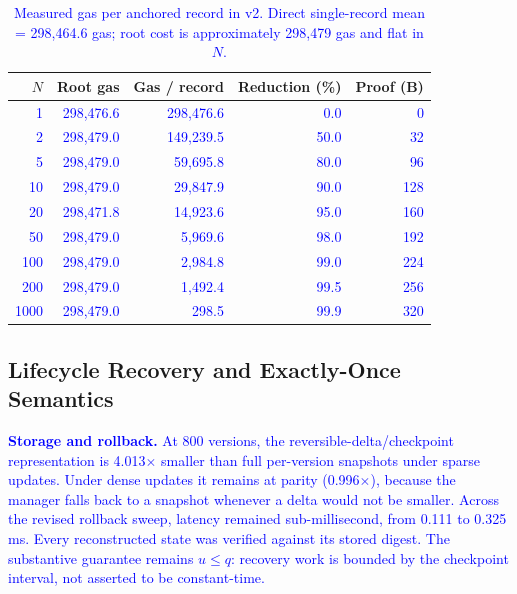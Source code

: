 \documentclass[final,5p,times,twocolumn]{elsarticle}
\begin{document}
\begin{table}[htbp]\centering
\caption{\textcolor{blue}{Measured gas per anchored record in v2. Direct single-record mean = 298{,}464.6 gas; root cost is approximately 298{,}479 gas and flat in $N$.}}
\label{tab:gas}
\scriptsize
\setlength{\tabcolsep}{2.4pt}
\begin{tabular}{rrrrr}\toprule
$N$ & Root gas & Gas / record & Reduction (\%) & Proof (B) \\\midrule
\textcolor{blue}{1}   & \textcolor{blue}{298{,}476.6} & \textcolor{blue}{298{,}476.6} & \textcolor{blue}{0.0} & \textcolor{blue}{0} \\
\textcolor{blue}{2}   & \textcolor{blue}{298{,}479.0} & \textcolor{blue}{149{,}239.5} & \textcolor{blue}{50.0} & \textcolor{blue}{32} \\
\textcolor{blue}{5}   & \textcolor{blue}{298{,}479.0} & \textcolor{blue}{59{,}695.8} & \textcolor{blue}{80.0} & \textcolor{blue}{96} \\
\textcolor{blue}{10}  & \textcolor{blue}{298{,}479.0} & \textcolor{blue}{29{,}847.9} & \textcolor{blue}{90.0} & \textcolor{blue}{128} \\
\textcolor{blue}{20}  & \textcolor{blue}{298{,}471.8} & \textcolor{blue}{14{,}923.6} & \textcolor{blue}{95.0} & \textcolor{blue}{160} \\
\textcolor{blue}{50}  & \textcolor{blue}{298{,}479.0} & \textcolor{blue}{5{,}969.6} & \textcolor{blue}{98.0} & \textcolor{blue}{192} \\
\textcolor{blue}{100} & \textcolor{blue}{298{,}479.0} & \textcolor{blue}{2{,}984.8} & \textcolor{blue}{99.0} & \textcolor{blue}{224} \\
\textcolor{blue}{200} & \textcolor{blue}{298{,}479.0} & \textcolor{blue}{1{,}492.4} & \textcolor{blue}{99.5} & \textcolor{blue}{256} \\
\textcolor{blue}{1000} & \textcolor{blue}{298{,}479.0} & \textcolor{blue}{298.5} & \textcolor{blue}{99.9} & \textcolor{blue}{320} \\
\bottomrule\end{tabular}
\end{table}



\subsection{\textbf{Lifecycle Recovery and Exactly-Once Semantics}}
\label{sec:res_lifecycle}

\textcolor{blue}{\textbf{Storage and rollback.} At 800 versions, the reversible-delta/checkpoint representation is 4.013$\times$ smaller than full per-version snapshots under sparse updates. Under dense updates it remains at parity (0.996$\times$), because the manager falls back to a snapshot whenever a delta would not be smaller. Across the revised rollback sweep, latency remained sub-millisecond, from 0.111 to 0.325\,ms. Every reconstructed state was verified against its stored digest. The substantive guarantee remains $u\leq q$: recovery work is bounded by the checkpoint interval, not asserted to be constant-time.}
\end{document}
